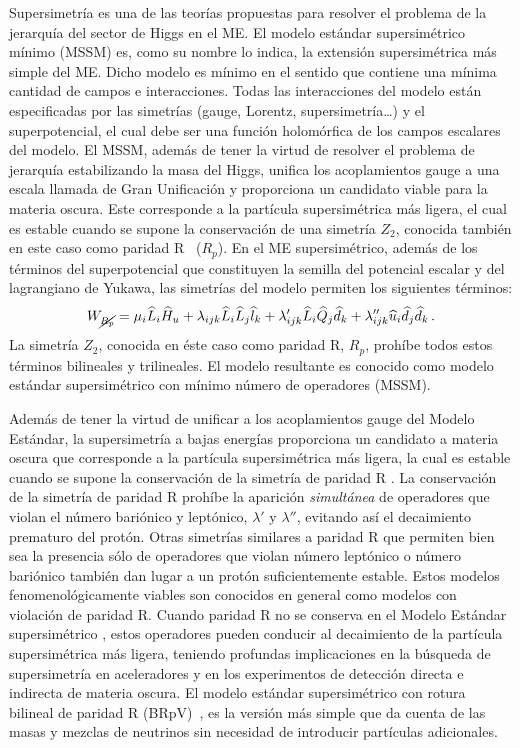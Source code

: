 Supersimetría \cite{Martin:1997ns,Haber:1984rc} es una de las teorías
propuestas para resolver el problema de la jerarquía del sector de Higgs
en el ME. El modelo estándar supersimétrico mínimo (MSSM) es, como su
nombre lo indica, la extensión supersimétrica más simple del ME.
Dicho modelo es mínimo en el sentido que contiene una mínima cantidad de campos
e interacciones.
Todas las interacciones del modelo están especificadas por las simetrías
(gauge, Lorentz, supersimetría\dots) y el superpotencial,
el cual debe ser una función holomórfica de los campos escalares del
modelo. El MSSM, además de tener la virtud de resolver el problema de jerarquía
estabilizando la masa del Higgs, unifica los acoplamientos gauge a una escala
llamada de Gran Unificación y proporciona un candidato viable para la materia
oscura. Este corresponde a la partícula supersimétrica más ligera, el
cual es estable cuando se supone la conservación de una simetría $Z_2$,
conocida también en este caso como paridad R~\cite{Ellis:1983ew} ($R_p$).
En el ME supersimétrico, además de los términos
del superpotencial que constituyen la semilla del potencial escalar y
del lagrangiano de Yukawa, las simetrías del modelo permiten los siguientes
términos:
\begin{equation}
  \label{eq:5}
  W_{\cancel{R_p}} = \mu_i\widehat{L}_i\widehat{H}_u + 
  \lambda_{i j k}\widehat{L}_i\widehat{L}_j\widehat{l}_k +
  \lambda'_{i j k}\widehat{L}_i\widehat{Q}_j\widehat{d}_k + 
  \lambda''_{ijk}\widehat{u}_i\widehat{d}_j\widehat{d}_k\,.
\end{equation}
La simetría $Z_2$, conocida en éste caso como paridad R, $R_p$,
prohíbe todos estos términos bilineales y trilineales. El modelo
resultante es conocido como modelo estándar supersimétrico con mínimo
número de operadores (MSSM). 

Además de tener la virtud de unificar a los acoplamientos gauge del
Modelo Estándar, la supersimetría a bajas energías proporciona un
candidato a materia oscura que corresponde a la partícula
supersimétrica más ligera, la cual es estable cuando se supone la
conservación de la simetría de paridad R \cite{Ellis:1983ew}. La
conservación de la simetría de paridad R prohíbe la aparición
\emph{simultánea} de operadores que violan el número bariónico y
leptónico, $\lambda'$ y $\lambda''$, evitando así el decaimiento
prematuro del protón. Otras simetrías similares a paridad R
que permiten bien sea la presencia sólo de operadores que violan número
leptónico o número bariónico también dan lugar a un protón
suficientemente estable. Estos modelos fenomenológicamente viables son
conocidos en general como modelos con violación de paridad R. Cuando
paridad R no se conserva en el Modelo Estándar supersimétrico
\cite{Barbier:2004ez}, estos operadores pueden conducir al decaimiento
de la partícula supersimétrica más ligera, teniendo profundas
implicaciones en la búsqueda de supersimetría en aceleradores y en los
experimentos de detección directa e indirecta de materia oscura. El
modelo estándar supersimétrico con rotura bilineal de paridad R
(BRpV)~\cite{}, es la versión más simple que da cuenta de las masas y
mezclas de neutrinos sin necesidad de introducir partículas
adicionales. 

